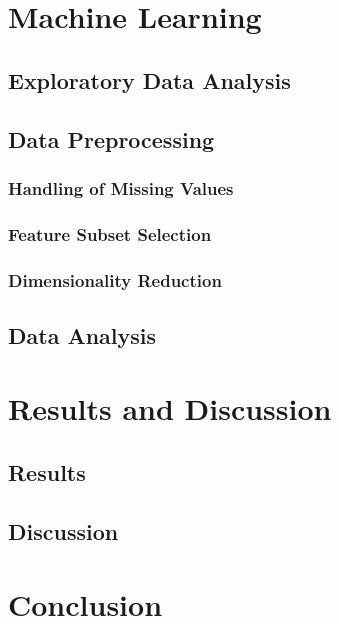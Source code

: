 \documentclass[a4paper, 11pt, oneside]{Thesis}  %
\begin{document}
\chapter{Machine Learning}

\section{Exploratory Data Analysis}

\section{Data Preprocessing}

\subsection{Handling of Missing Values}

\subsection{Feature Subset Selection}

\subsection{Dimensionality Reduction}

\section{Data Analysis}


\chapter{Results and Discussion}

\section{Results}

\section{Discussion}

\chapter{Conclusion}
\end{document}
